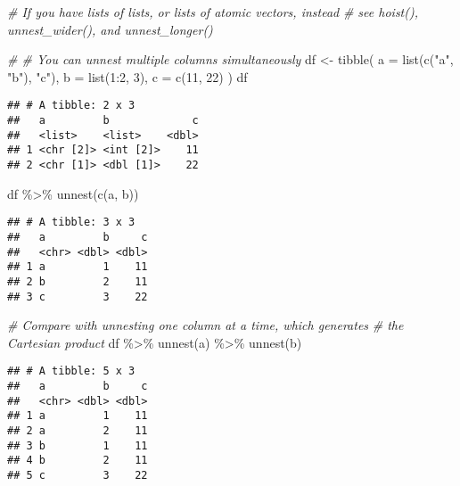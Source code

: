 \documentclass[
]{book}
\newenvironment{Shaded}{\begin{snugshade}}{\end{snugshade}}
\newcommand{\AttributeTok}[1]{\textcolor[rgb]{0.77,0.63,0.00}{#1}}
\newcommand{\CommentTok}[1]{\textcolor[rgb]{0.56,0.35,0.01}{\textit{#1}}}
\newcommand{\DecValTok}[1]{\textcolor[rgb]{0.00,0.00,0.81}{#1}}
\newcommand{\FunctionTok}[1]{\textcolor[rgb]{0.00,0.00,0.00}{#1}}
\newcommand{\NormalTok}[1]{#1}
\newcommand{\OtherTok}[1]{\textcolor[rgb]{0.56,0.35,0.01}{#1}}
\newcommand{\SpecialCharTok}[1]{\textcolor[rgb]{0.00,0.00,0.00}{#1}}
\newcommand{\StringTok}[1]{\textcolor[rgb]{0.31,0.60,0.02}{#1}}
\begin{document}
\begin{Shaded}
\begin{Highlighting}[]
\CommentTok{\# If you have lists of lists, or lists of atomic vectors, instead}
\CommentTok{\# see hoist(), unnest\_wider(), and unnest\_longer()}

\CommentTok{\#\textquotesingle{} \# You can unnest multiple columns simultaneously}
\NormalTok{df }\OtherTok{\textless{}{-}} \FunctionTok{tibble}\NormalTok{(}
 \AttributeTok{a =} \FunctionTok{list}\NormalTok{(}\FunctionTok{c}\NormalTok{(}\StringTok{"a"}\NormalTok{, }\StringTok{"b"}\NormalTok{), }\StringTok{"c"}\NormalTok{),}
 \AttributeTok{b =} \FunctionTok{list}\NormalTok{(}\DecValTok{1}\SpecialCharTok{:}\DecValTok{2}\NormalTok{, }\DecValTok{3}\NormalTok{),}
 \AttributeTok{c =} \FunctionTok{c}\NormalTok{(}\DecValTok{11}\NormalTok{, }\DecValTok{22}\NormalTok{)}
\NormalTok{)}
\NormalTok{df}
\end{Highlighting}
\end{Shaded}

\begin{verbatim}
## # A tibble: 2 x 3
##   a         b             c
##   <list>    <list>    <dbl>
## 1 <chr [2]> <int [2]>    11
## 2 <chr [1]> <dbl [1]>    22
\end{verbatim}

\begin{Shaded}
\begin{Highlighting}[]
\NormalTok{df }\SpecialCharTok{\%\textgreater{}\%} 
  \FunctionTok{unnest}\NormalTok{(}\FunctionTok{c}\NormalTok{(a, b))}
\end{Highlighting}
\end{Shaded}

\begin{verbatim}
## # A tibble: 3 x 3
##   a         b     c
##   <chr> <dbl> <dbl>
## 1 a         1    11
## 2 b         2    11
## 3 c         3    22
\end{verbatim}

\begin{Shaded}
\begin{Highlighting}[]
\CommentTok{\# Compare with unnesting one column at a time, which generates}
\CommentTok{\# the Cartesian product}
\NormalTok{df }\SpecialCharTok{\%\textgreater{}\%} 
  \FunctionTok{unnest}\NormalTok{(a) }\SpecialCharTok{\%\textgreater{}\%} 
  \FunctionTok{unnest}\NormalTok{(b)}
\end{Highlighting}
\end{Shaded}

\begin{verbatim}
## # A tibble: 5 x 3
##   a         b     c
##   <chr> <dbl> <dbl>
## 1 a         1    11
## 2 a         2    11
## 3 b         1    11
## 4 b         2    11
## 5 c         3    22
\end{verbatim}
\end{document}
